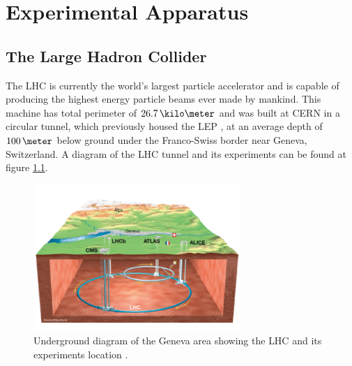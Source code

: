 \chapter{Experimental Apparatus}
\label{CHAPTER:ExperimentalApparatus}

\glsresetall %

\section{The Large Hadron Collider}
\label{SECTION:ExperimentalApparatus_LHC}

%

%  

The \gls{LHC} \cite{ARTICLE:LHCDesignReportVol1,ARTICLE:LHCMachine} is currently the world's largest particle accelerator and is capable of producing the highest energy particle beams ever made by mankind. This machine has total perimeter of $26.7\,\kilo\meter$ and was built at \gls{CERN} in a circular tunnel, which previously housed the \gls{LEP} \cite{LEPTDR:LEPInjectorStudyGroup}, at an average depth of $100\,\meter$ below ground under the Franco-Swiss border near Geneva, Switzerland. A diagram of the \gls{LHC} tunnel and its experiments can be found at figure \ref{FIGURE:ExperimentalApparatus_LHCLayoutUnderground}.

\begin{figure}[!htb]
  \centering
  \includegraphics[width=0.70\textwidth]{Chapter02/LHC/Images/LHCUnderGroundDiagram.png}
  \caption{Underground diagram of the Geneva area showing the \gls{LHC} and its experiments location \cite{IMAGEREF:LHCDiagram}.}
  \label{FIGURE:ExperimentalApparatus_LHCLayoutUnderground}
\end{figure}

